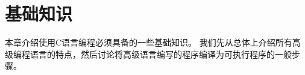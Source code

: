 \chapter{基础知识}
{
    本章介绍使用C语言编程必须具备的一些基础知识。
    我们先从总体上介绍所有高级编程语言的特点，然后讨论将高级语言编写的程序编译为可执行程序的一般步骤。

    
    
    
    
    
    
}

\cleardoublepage

\endinput
